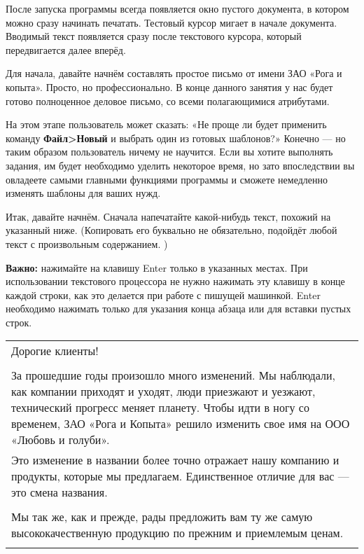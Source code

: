 \documentclass[a4paper,10pt]{article}
\begin{document}
После запуска программы всегда появляется окно пустого документа, в котором можно сразу  начинать печатать. Тестовый курсор мигает в начале документа. Вводимый текст появляется сразу после текстового курсора, который передвигается далее вперёд. 

Для начала, давайте начнём составлять простое письмо от имени ЗАО «Рога и копыта». Просто, но профессионально. В конце данного занятия у нас будет готово полноценное деловое письмо, со всеми полагающимися атрибутами.

На этом этапе пользователь может сказать: «Не проще ли будет применить команду \textbf{Файл>Новый} и выбрать один из готовых шаблонов?» Конечно — но таким образом пользователь ничему не научится. Если вы хотите выполнять задания, им будет необходимо уделить некоторое время, но зато впоследствии вы овладеете самыми главными функциями программы и сможете немедленно изменять шаблоны для ваших нужд.

Итак, давайте начнём. Сначала напечатайте какой-нибудь текст, похожий на указанный ниже. (Копировать его буквально не обязательно, подойдёт любой текст с произвольным содержанием. )

\begin{mdframed}[backgroundcolor=blue!10]
\textbf{Важно:} нажимайте на клавишу Enter \keys{\return} только в указанных местах. При использовании текстового процессора не нужно нажимать эту клавишу в конце каждой строки, как это делается при работе с пишущей машинкой. Enter \keys{\return} необходимо нажимать только для указания конца абзаца или для вставки пустых строк.
\end{mdframed}

\begin{center}
\begin{tabular}{ | m{15cm} | }
\hline
 Дорогие клиенты! \keys{\return} \\ 
 \keys{\return} \\
 За прошедшие годы произошло много изменений. Мы наблюдали, как компании приходят и уходят, люди приезжают и уезжают, технический прогресс меняет планету. Чтобы идти в ногу со временем, ЗАО «Рога и Копыта» решило изменить свое имя на ООО «Любовь и голуби».\keys{\return} \\
 Это изменение в названии более точно отражает нашу компанию и продукты, которые мы предлагаем. Единственное отличие для вас — это смена названия.\keys{\return} \\
 \keys{\return} \\
 Мы так же, как и прежде, рады предложить вам ту же самую высококачественную продукцию по прежним и приемлемым ценам.\keys{\return} \\
 \keys{\return} \\
\hline
\end{tabular}
\end{center}
\end{document}
